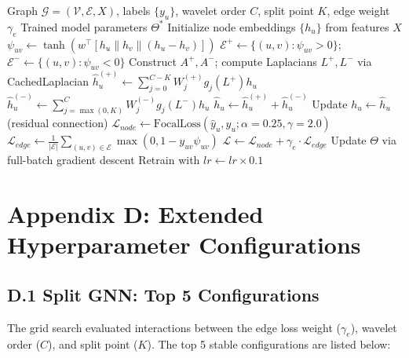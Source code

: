 \documentclass[12pt]{article}
\begin{document}
\begin{algorithm}[H]
\caption{SplitGNN Training Procedure}
\begin{algorithmic}[1]
\REQUIRE Graph $\mathcal{G}=(\mathcal{V},\mathcal{E},X)$, labels $\{y_u\}$, wavelet order $C$, split point $K$, edge weight $\gamma_e$
\ENSURE Trained model parameters $\Theta^*$
\STATE Initialize node embeddings $\{h_u\}$ from features $X$
        \STATE $\psi_{uv} \leftarrow \tanh(w^\top [h_u \parallel h_v \parallel (h_u - h_v)])$
    \ENDFOR
    \STATE $\mathcal{E}^+ \leftarrow \{(u,v) : \psi_{uv} > 0\}$; \quad $\mathcal{E}^- \leftarrow \{(u,v) : \psi_{uv} < 0\}$
    \STATE Construct $A^+, A^-$; compute Laplacians $L^+, L^-$ via CachedLaplacian
        \STATE $\hat{h}_u^{(+)} \leftarrow \sum_{j=0}^{C-K} W_j^{(+)} g_j(L^+) h_u$
        \STATE $\hat{h}_u^{(-)} \leftarrow \sum_{j=\max(0,K)}^C W_j^{(-)} g_j(L^-) h_u$
        \STATE $\hat{h}_u \leftarrow \hat{h}_u^{(+)} + \hat{h}_u^{(-)}$
        \STATE Update $h_u \leftarrow \hat{h}_u$ \hfill (residual connection)
    \ENDFOR
    \STATE $\mathcal{L}_{node} \leftarrow \text{FocalLoss}(\hat{y}_u, y_u; \alpha=0.25, \gamma=2.0)$
    \STATE $\mathcal{L}_{edge} \leftarrow \frac{1}{|\mathcal{E}|} \sum_{(u,v) \in \mathcal{E}} \max(0, 1 - y_{uv}\psi_{uv})$
    \STATE $\mathcal{L} \leftarrow \mathcal{L}_{node} + \gamma_e \cdot \mathcal{L}_{edge}$
    \STATE Update $\Theta$ via full-batch gradient descent
\ENDFOR
{}
    \STATE Retrain with $lr \leftarrow lr \times 0.1$
\ENDFOR
\end{algorithmic}
\end{algorithm}

\newpage

\section*{Appendix D: Extended Hyperparameter Configurations}

\subsection*{D.1 Split GNN: Top 5 Configurations}

The grid search evaluated interactions between the edge loss weight ($\gamma_e$), wavelet order ($C$), and split point ($K$). The top 5 stable configurations are listed below:
\end{document}
